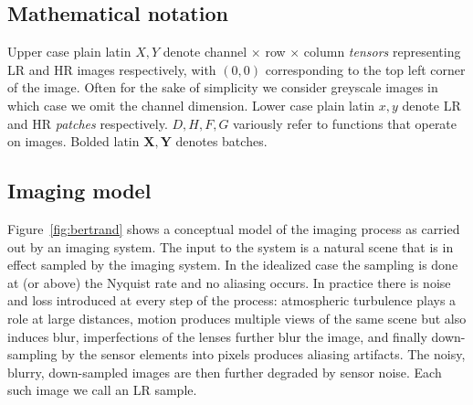 \subsection{Mathematical notation}\label{subsec:notation}
Upper case plain latin $X, Y$ denote channel $\times$ row $\times$ column \textit{tensors} representing LR and HR images respectively, with $(0,0)$ corresponding to the top left corner of the image.
%
Often for the sake of simplicity we consider greyscale images in which case we omit the channel dimension.
%
Lower case plain latin $x, y$ denote LR and HR \textit{patches} respectively.
%
$D, H, F, G$ variously refer to functions that operate on images.
%
Bolded latin $\bm{X}, \bm{Y}$ denotes batches.

\subsection{Imaging model}\label{subsec:imaging-model}
Figure~\ref{fig:bertrand} shows a conceptual model of the imaging process as carried out by an imaging system.
%
The input to the system is a natural scene that is in effect sampled by the imaging system.
%
In the idealized case the sampling is done at (or above) the Nyquist rate and no aliasing occurs.
%
In practice there is noise and loss introduced at every step of the process: atmospheric turbulence plays a role at large distances, motion produces multiple views of the same scene but also induces blur, imperfections of the lenses further blur the image, and finally down-sampling by the sensor elements into pixels produces aliasing artifacts.
%
The noisy, blurry, down-sampled images are then further degraded by sensor noise.
%
Each such image we call an LR sample.
